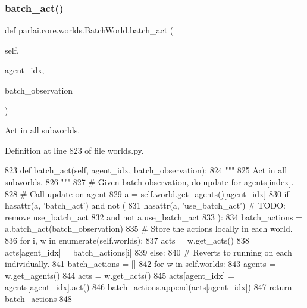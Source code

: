 \subsubsection{\texorpdfstring{batch\+\_\+act()}{batch\_act()}}
{\footnotesize\ttfamily def parlai.\+core.\+worlds.\+Batch\+World.\+batch\+\_\+act (\begin{DoxyParamCaption}\item[{}]{self,  }\item[{}]{agent\+\_\+idx,  }\item[{}]{batch\+\_\+observation }\end{DoxyParamCaption})}

\begin{DoxyVerb}Act in all subworlds.
\end{DoxyVerb}
 

Definition at line 823 of file worlds.\+py.


\begin{DoxyCode}
823     \textcolor{keyword}{def }batch\_act(self, agent\_idx, batch\_observation):
824         \textcolor{stringliteral}{"""}
825 \textcolor{stringliteral}{        Act in all subworlds.}
826 \textcolor{stringliteral}{        """}
827         \textcolor{comment}{# Given batch observation, do update for agents[index].}
828         \textcolor{comment}{# Call update on agent}
829         a = self.world.get\_agents()[agent\_idx]
830         \textcolor{keywordflow}{if} hasattr(a, \textcolor{stringliteral}{'batch\_act'}) \textcolor{keywordflow}{and} \textcolor{keywordflow}{not} (
831             hasattr(a, \textcolor{stringliteral}{'use\_batch\_act'})  \textcolor{comment}{# TODO: remove use\_batch\_act}
832             \textcolor{keywordflow}{and} \textcolor{keywordflow}{not} a.use\_batch\_act
833         ):
834             batch\_actions = a.batch\_act(batch\_observation)
835             \textcolor{comment}{# Store the actions locally in each world.}
836             \textcolor{keywordflow}{for} i, w \textcolor{keywordflow}{in} enumerate(self.worlds):
837                 acts = w.get\_acts()
838                 acts[agent\_idx] = batch\_actions[i]
839         \textcolor{keywordflow}{else}:
840             \textcolor{comment}{# Reverts to running on each individually.}
841             batch\_actions = []
842             \textcolor{keywordflow}{for} w \textcolor{keywordflow}{in} self.worlds:
843                 agents = w.get\_agents()
844                 acts = w.get\_acts()
845                 acts[agent\_idx] = agents[agent\_idx].act()
846                 batch\_actions.append(acts[agent\_idx])
847         \textcolor{keywordflow}{return} batch\_actions
848 
\end{DoxyCode}
\mbox{\label{classparlai_1_1core_1_1worlds_1_1BatchWorld_a01faab842dc28b580dcaeacee491c5f5}} 
